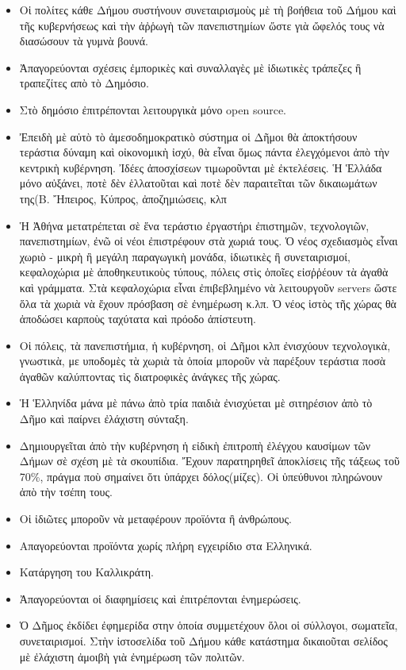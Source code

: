 \documentclass[a4paper]{article}
\begin{document}
\begin{itemize}
\item Οἱ πολίτες κάθε Δήμου συστήνουν συνεταιρισμοὺς μὲ τὴ βοήθεια τοῦ Δήμου καὶ τῆς κυβερνήσεως καὶ τὴν ἀῤῥωγὴ τῶν πανεπιστημίων ὥστε γιὰ ὤφελός τους νὰ διασώσουν τὰ γυμνὰ βουνά.
\item Ἀπαγορεύονται σχέσεις ἐμπορικὲς καὶ συναλλαγὲς μὲ ἰδιωτικὲς τράπεζες ἢ τραπεζίτες απὸ τὸ Δημόσιο.
\item Στὸ δημόσιο ἐπιτρέπονται λειτουργικὰ μόνο open source.
\item Ἐπειδὴ μὲ αὐτὸ τὸ ἀμεσοδημοκρατικὸ σύστημα οἱ Δῆμοι θὰ ἀποκτήσουν τεράστια δύναμη καὶ οἰκονομικὴ ἰσχύ, θὰ εἶναι ὅμως πάντα ἐλεγχόμενοι ἀπὸ τὴν κεντρικὴ κυβέρνηση. Ἰδέες ἀποσχίσεων τιμωροῦνται μὲ ἐκτελέσεις. Ἡ Ἑλλάδα μόνο αὐξάνει, ποτὲ δὲν ἑλλατοῦται καὶ ποτὲ δὲν παραιτεῖται τῶν δικαιωμάτων της(Β. Ἤπειρος, Κύπρος, ἀποζημιώσεις, κλπ
\item Ἡ Ἀθήνα μετατρέπεται σὲ ἕνα τεράστιο ἐργαστήρι ἐπιστημῶν, τεχνολογιῶν, πανεπιστημίων, ἐνῶ οἱ νέοι ἐπιστρέφουν στὰ χωριά τους. Ὁ νέος σχεδιασμὸς εἶναι χωριὸ - μικρὴ ἢ μεγάλη παραγωγικὴ μονάδα, ἰδιωτικὲς ἢ συνεταιρισμοί, κεφαλοχώρια μὲ ἀποθηκευτικοὺς τύπους, πόλεις στὶς ὁποῖες εἰσῤῥέουν τὰ ἀγαθὰ καὶ γράμματα. Στὰ κεφαλοχώρια εἶναι ἐπιβεβλημένο νὰ λειτουργοῦν servers ὥστε ὅλα τὰ χωριὰ νὰ ἔχουν πρόσβαση σὲ ἐνημέρωση κ.λπ. Ὁ νέος ἱστὸς τῆς χώρας θὰ ἀποδώσει καρποὺς ταχύτατα καὶ πρόοδο ἀπίστευτη.
\item Οἱ πόλεις, τὰ πανεπιστήμια, ἡ κυβέρνηση, οἱ Δῆμοι κλπ ἐνισχύουν τεχνολογικὰ, γνωστικὰ, με υποδομὲς τὰ χωριὰ τὰ ὁποία μποροῦν νὰ παρέξουν τεράστια ποσὰ ἁγαθῶν καλύπτοντας τὶς διατροφικὲς ἀνάγκες τῆς χώρας.
\item Ἡ Ἑλληνίδα μάνα μὲ πάνω ἀπὸ τρία παιδιὰ ἐνισχύεται μὲ σιτηρέσιον ἀπὸ τὸ Δῆμο καὶ παίρνει ἐλάχιστη σύνταξη.
\item Δημιουργεῖται ἀπὸ τὴν κυβέρνηση ἡ εἰδικὴ ἐπιτροπὴ ἐλέγχου καυσίμων τῶν Δήμων σὲ σχέση μὲ τὰ σκουπίδια. Ἔχουν παρατηρηθεῖ ἀποκλίσεις τῆς τάξεως τοῦ 70\%, πράγμα ποὺ σημαίνει ὅτι ὑπάρχει δόλος(μίζες). Οἱ ὑπεύθυνοι πληρώνουν ἀπὸ τὴν τσέπη τους.
\item Οἱ ἰδιῶτες μποροῦν νὰ μεταφέρουν προϊόντα ἢ ἀνθρώπους.
\item Απαγορεύονται προϊόντα χωρίς πλήρη εγχειρίδιο στα Ελληνικά.
\item Κατάργηση του Καλλικράτη.
\item Ἀπαγορεύονται οἱ διαφημίσεις καὶ ἐπιτρέπονται ἐνημερώσεις.
\item Ὁ Δῆμος ἐκδίδει ἐφημερίδα στην ὁποία συμμετέχουν ὅλοι οἱ σύλλογοι, σωματεῖα, συνεταιρισμοί. Στὴν ἰστοσελίδα τοῦ Δήμου κάθε κατάστημα δικαιοῦται σελίδος μὲ ἐλάχιστη ἀμοιβὴ γιὰ ἐνημέρωση τῶν πολιτῶν.

\end{itemize}
\end{document}
